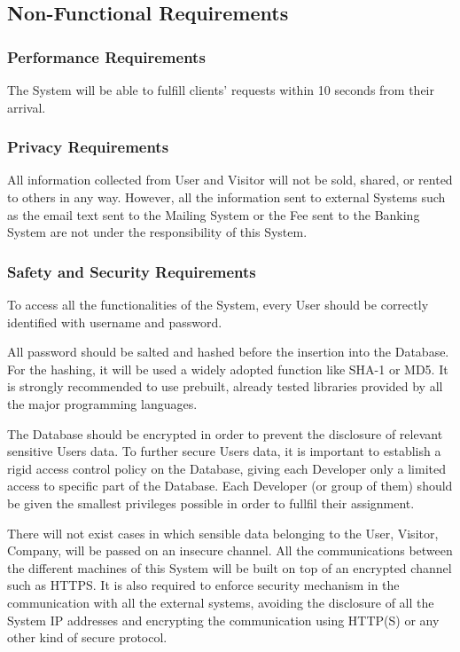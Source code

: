 \subsection{Non-Functional Requirements}
\subsubsection{Performance Requirements}
The System will be able to fulfill clients' requests within 10 seconds from their arrival.

\subsubsection{Privacy Requirements}
All information collected from User and Visitor will not be sold, shared, or rented to others in any way. 
However, all the information sent to external Systems such as the email text sent to the Mailing System or the Fee sent to the Banking System are not under the responsibility of this System.

\subsubsection{Safety and Security Requirements}
To access all the functionalities of the System, every User should be correctly identified with username and password. 

All password should be salted and hashed before the insertion into the Database. For the hashing, it will be used a widely adopted function like SHA-1 or MD5. It is strongly recommended to use prebuilt, already tested libraries provided by all the major programming languages.

The Database should be encrypted in order to prevent the disclosure of relevant sensitive Users data. To further secure Users data, it is important to establish a rigid access control policy on the Database, giving each Developer only a limited access to specific part of the Database. Each Developer (or group of them) should be given the smallest privileges possible in order to fullfil their assignment.

There will not exist cases in which sensible data belonging to the User, Visitor, Company, will be passed on an insecure channel. All the communications between the different machines of this System will be built on top of an encrypted channel such as HTTPS. It is also required to enforce security mechanism in the communication with all the external systems, avoiding the disclosure of all the System IP addresses and encrypting the communication using HTTP(S) or any other kind of secure protocol.

